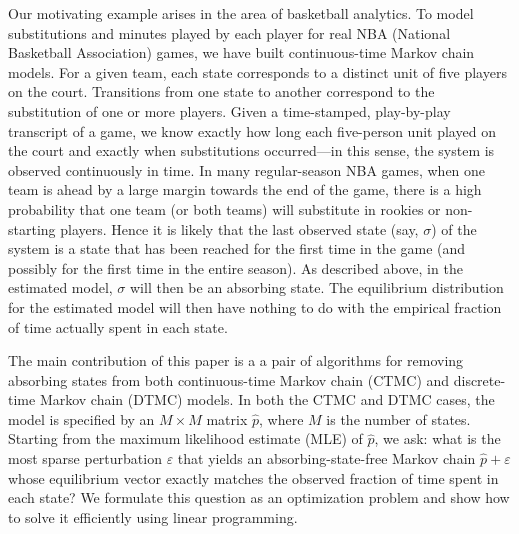 \documentclass[review,letterpaper,11pt]{elsarticle}
\begin{document}
Our motivating example arises in the area of basketball analytics.  To model substitutions and minutes played by each player for real NBA (National Basketball Association) games, we have built continuous-time Markov chain models.  For a given team, each state corresponds to a distinct unit of five players on the court.  Transitions from one state to another correspond to the substitution of one or more players.  Given a time-stamped, play-by-play transcript of a game, we know exactly how long each five-person unit played on the court and exactly when substitutions occurred---in this sense, the system is observed continuously in time.  In many regular-season NBA games, when one team is ahead by a large margin towards the end of the game, there is a high probability that one team (or both teams) will substitute in rookies or non-starting players.  Hence it is likely that the last observed state (say, $\sigma$) of the system is a state that has been reached for the first time in the game (and possibly for the first time in the entire season).  As described above, in the estimated model, $\sigma$ will then be an absorbing state.  The equilibrium distribution for the estimated model will then have nothing to do with the empirical fraction of time actually spent in each state.

The main contribution of this paper is a a pair of algorithms for removing absorbing states from both continuous-time Markov chain (CTMC) and discrete-time Markov chain (DTMC) models.  In both the CTMC and DTMC cases, the model is specified by an $M \times M$ matrix $\widehat{p}$, where $M$ is the number of states.  Starting from the maximum likelihood estimate (MLE) of $\widehat{p}$, we ask: what is the most sparse perturbation $\varepsilon$ that yields an absorbing-state-free Markov chain $\widehat{p} + \varepsilon$ whose equilibrium vector exactly matches the observed fraction of time spent in each state?  We formulate this question as an optimization problem and show how to solve it efficiently using linear programming.
\end{document}

